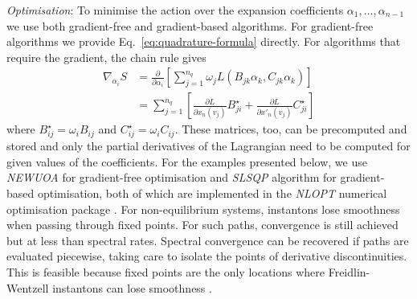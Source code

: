 \emph{Optimisation}: To minimise the action over the expansion coefficients
$\alpha_{1},\ldots,\alpha_{n-1}$ we use both gradient-free and gradient-based
algorithms. For gradient-free algorithms we provide Eq.~\ref{eq:quadrature-formula}
directly. For algorithms that require the gradient, the chain rule
gives
\begin{align}
\nabla_{\alpha_{i}}S & =\frac{\partial}{\partial\alpha_{i}}\left[\sum_{j=1}^{n_{q}}\omega_{j}L(B_{jk}\alpha_{k},C_{jk}\alpha_{k})\right]\\
 & =\sum_{j=1}^{n_{q}}\left[\frac{\partial L}{\partial x_{n}(v_{j})}B_{ji}^{\star}+\frac{\partial L}{\partial x'_{n}(v_{j})}C_{ji}^{\star}\right]\nonumber 
\end{align}
where $B_{ij}^{\star}=\omega_{i}B_{ij}$ and $C_{ij}^{\star}=\omega_{i}C_{ij}$.
These matrices, too, can be precomputed and stored and only the partial
derivatives of the Lagrangian need to be computed for given values
of the coefficients. For the examples presented below, we use \emph{NEWUOA}
\citep{powell2006newuoa} for gradient-free optimisation and \emph{SLSQP}
algorithm \citep{kraft1994} for gradient-based optimisation,
both of which are implemented in the \emph{NLOPT} numerical optimisation
package \citep{johnson2014nlopt}. For non-equilibrium systems, instantons
lose smoothness when passing through fixed points. For such paths,
convergence is still achieved but at less than spectral rates. Spectral
convergence can be recovered if paths are evaluated piecewise, taking
care to isolate the points of derivative discontinuities. This is
feasible because fixed points are the only locations where Freidlin-Wentzell
instantons can lose smoothness \citep{graham1987macroscopic}. %

